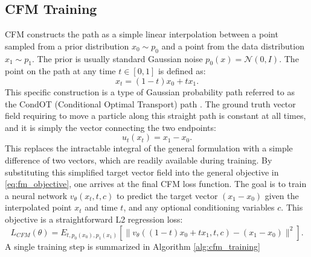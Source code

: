 \subsection{CFM Training}
CFM constructs the path as a simple linear interpolation between a point sampled from a prior distribution $x_0 \sim p_0$ and a point from the data distribution $x_1 \sim p_1$. The prior is usually standard Gaussian noise $p_0(x) = \mathcal{N} (0, I)$. The point on the path at any time $t \in [0,1]$ is defined as:
\begin{equation}
	x_t=(1 - t)x_0+ tx_1.
\end{equation}
This specific construction is a type of Gaussian probability path referred to as the CondOT (Conditional Optimal Transport) path \cite{lipmanFlowMatchingGuide2024a}. The ground truth vector field requiring to move a particle along this straight path is constant at all times, and it is simply the vector connecting the two endpoints:
\begin{equation}
	u_t(x_t) = x_1-x_0.
\end{equation}
This replaces the intractable integral of the general formulation with a simple difference of two vectors, which are readily available during training.
By substituting this simplified target vector field into the general objective in \ref{eq:fm_objective}, one arrives at the final CFM loss function. The goal is to train a neural network $ v_{\theta} (x_t, t, c)$ to predict the target vector $(x_1 - x_0) $ given the interpolated point $x_t$ and time $t$, and any optional conditioning variables $c$. This objective is a straightforward L2 regression loss:
\begin{equation}
	L_{CFM}(\theta)=E_{t,p_0(x_0),p_1(x_1)}[\|v_\theta((1-t)x_0 + tx_1, t, c)-(x_1-x_0)\|^2].
\end{equation}
A single training step is summarized in Algorithm \ref{alg:cfm_training}


